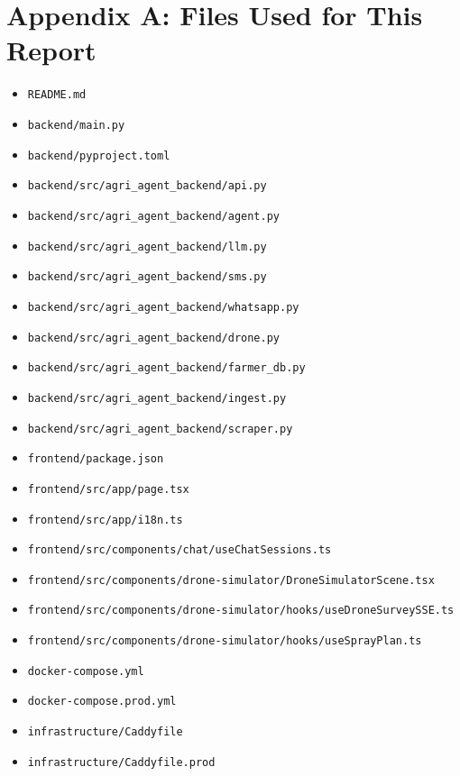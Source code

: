 \documentclass[11pt,a4paper]{article}
\begin{document}
\section{Appendix A: Files Used for This Report}

\begin{itemize}
  \item \texttt{README.md}
  \item \texttt{backend/main.py}
  \item \texttt{backend/pyproject.toml}
  \item \texttt{backend/src/agri\_agent\_backend/api.py}
  \item \texttt{backend/src/agri\_agent\_backend/agent.py}
  \item \texttt{backend/src/agri\_agent\_backend/llm.py}
  \item \texttt{backend/src/agri\_agent\_backend/sms.py}
  \item \texttt{backend/src/agri\_agent\_backend/whatsapp.py}
  \item \texttt{backend/src/agri\_agent\_backend/drone.py}
  \item \texttt{backend/src/agri\_agent\_backend/farmer\_db.py}
  \item \texttt{backend/src/agri\_agent\_backend/ingest.py}
  \item \texttt{backend/src/agri\_agent\_backend/scraper.py}
  \item \texttt{frontend/package.json}
  \item \texttt{frontend/src/app/page.tsx}
  \item \texttt{frontend/src/app/i18n.ts}
  \item \texttt{frontend/src/components/chat/useChatSessions.ts}
  \item \texttt{frontend/src/components/drone-simulator/DroneSimulatorScene.tsx}
  \item \texttt{frontend/src/components/drone-simulator/hooks/useDroneSurveySSE.ts}
  \item \texttt{frontend/src/components/drone-simulator/hooks/useSprayPlan.ts}
  \item \texttt{docker-compose.yml}
  \item \texttt{docker-compose.prod.yml}
  \item \texttt{infrastructure/Caddyfile}
  \item \texttt{infrastructure/Caddyfile.prod}
\end{itemize}
\end{document}
